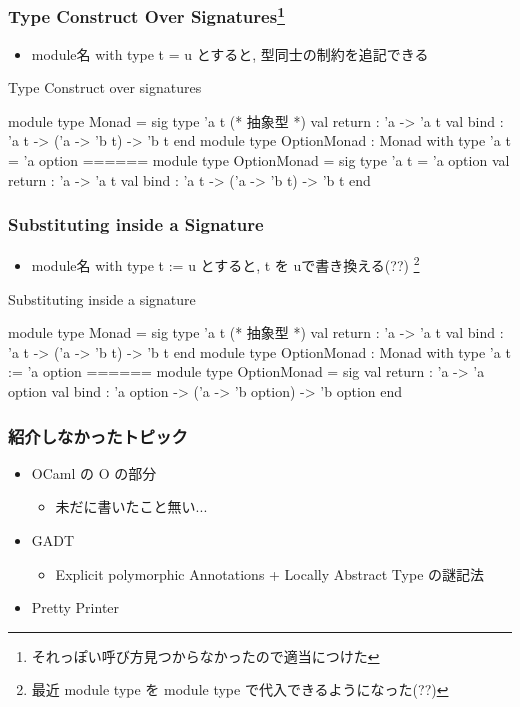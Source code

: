 \documentclass[dvipdfmx,14pt,notheorems,aspectratio=169]{beamer}
\theoremstyle{definition}
\begin{document}
    \begin{frame}[fragile]\frametitle{Type Construct Over Signatures\footnote{それっぽい呼び方見つからなかったので適当につけた}}
        \begin{itemize}
            \item module名 with type t = u とすると, 型同士の制約を追記できる
        \end{itemize}
        \begin{exampleblock}{Type Construct over signatures}
            \scriptsize
            \begin{verbatimtab}
module type Monad = sig
    type 'a t (* 抽象型 *)
    val return : 'a -> 'a t
    val bind : 'a t -> ('a -> 'b t) -> 'b t
end
module type OptionMonad : Monad with type 'a t = 'a option
======
module type OptionMonad = sig
    type 'a t = 'a option
    val return : 'a -> 'a t
    val bind : 'a t -> ('a -> 'b t) -> 'b t
  end\end{verbatimtab}
        \end{exampleblock}
    \end{frame}


    \begin{frame}[fragile]\frametitle{Substituting inside a Signature}
        \begin{itemize}
            \item module名 with type t := u とすると, t を uで書き換える(??)
            \footnote{最近 module type を module type で代入できるようになった(??)}
        \end{itemize}
        \begin{exampleblock}{Substituting inside a signature}
            \scriptsize
            \begin{verbatimtab}
module type Monad = sig
    type 'a t (* 抽象型 *)
    val return : 'a -> 'a t
    val bind : 'a t -> ('a -> 'b t) -> 'b t
end
module type OptionMonad : Monad with type 'a t := 'a option
======
module type OptionMonad = sig
    val return : 'a -> 'a option
    val bind : 'a option -> ('a -> 'b option) -> 'b option
  end\end{verbatimtab}
        \end{exampleblock}
    \end{frame}

    \begin{frame}[fragile]\frametitle{紹介しなかったトピック}
        \begin{itemize}
            \item OCaml の O の部分
            \begin{itemize}
                \item 未だに書いたこと無い...
            \end{itemize}
            \item GADT \cite{gadt}
            \begin{itemize}
                \item Explicit polymorphic Annotations + Locally Abstract Type の謎記法
            \end{itemize}
            \item Pretty Printer\cite{pp}
        \end{itemize}
    \end{frame}
\end{document}
